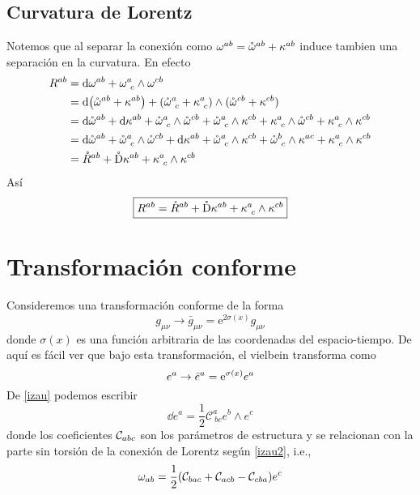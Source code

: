 \subsection{Curvatura de Lorentz}
Notemos que al separar la conexión como ${\omega}^{ab}=\mathring\omega^{ab}+\kappa^{ab}$ induce tambien una separación en la curvatura. En efecto
\begin{align}
  R^{ab}&=\dd\omega^{ab}+\omega^{a}_{~c}\wedge\omega^{cb}\\
  &=\dd (\mathring\omega^{ab}+\kappa^{ab})+(\mathring\omega^{a}_{~c}+\kappa^{a}_{~c})\wedge (\mathring\omega^{cb}+\kappa^{cb})\\
  &=\dd \mathring\omega^{ab}+\dd \kappa^{ab}+\mathring\omega^{a}_{~c}\wedge \mathring\omega^{cb}+\mathring\omega^{a}_{~c}\wedge \kappa^{cb}+ \kappa^{a}_{~c}\wedge \mathring\omega^{cb}+\kappa^{a}_{~c}\wedge \kappa^{cb}\\
  &=\dd \mathring\omega^{ab}+\mathring\omega^{a}_{~c}\wedge \mathring\omega^{cb}+\dd \kappa^{ab}+\mathring\omega^{a}_{~c}\wedge \kappa^{cb}+\mathring{\omega}^b_{~c}\wedge \kappa^{ac}+\kappa^{a}_{~c}\wedge \kappa^{cb}\\
  &=\mathring{R}^{ab}+\mathring{\mathrm{D}}\kappa^{ab}+\kappa^{a}_{~c}\wedge \kappa^{cb}
\end{align}
Así
\begin{equation}\label{R-decomposed}
  \boxed{R^{ab}=\mathring{R}^{ab}+\mathring{\mathrm{D}}\kappa^{ab}+\kappa^{a}_{~c}\wedge \kappa^{cb}}
\end{equation}



















\section{Transformación conforme}
Consideremos una transformación conforme de la forma
\begin{equation}
  g_{\mu\nu}\to \bar{g}_{\mu\nu}=\mathrm{e}^{2\sigma(x)}g_{\mu\nu}
\end{equation}
donde $\sigma(x)$ es una función arbitraria de las coordenadas del espacio-tiempo. De aquí es fácil ver que bajo esta transformación, el vielbein transforma como
\begin{equation}
  e^{a}\to \bar{e}^{a}=\mathrm{e}^{\sigma(x)}e^{a}
\end{equation}
De \eqref{izau} podemos escribir\begin{equation}
	\dd e^{a}=\frac{1}{2}\mathcal{C}^{a}_{~bc} e^{b}\wedge e^{c}
\end{equation}
donde los coeficientes $\mathcal{C}_{abc}$ son los parámetros de estructura y se relacionan con la parte sin torsión de la conexión de Lorentz según \eqref{izau2}, i.e.,
\begin{equation}
 	\omega_{ab}=\frac{1}{2}(\mathcal{C}_{bac}+\mathcal{C}_{acb}-\mathcal{C}_{cba})e^c
\end{equation}

